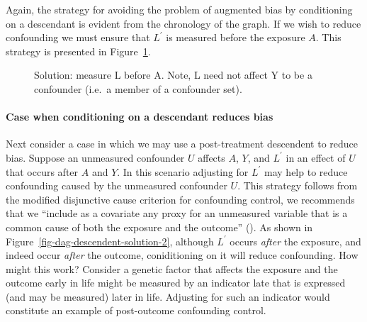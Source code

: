 \documentclass[
  singlecolumn,
  9pt]{article}
\let\oldparagraph\paragraph
\renewcommand{\paragraph}[1]{\oldparagraph{#1}\mbox{}}
\begin{document}
Again, the strategy for avoiding the problem of augmented bias by
conditioning on a descendant is evident from the chronology of the
graph. If we wish to reduce confounding we must ensure that \(L^\prime\)
is measured before the exposure \(A\). This strategy is presented in
Figure~\ref{fig-dag-descendent-solution}.

\begin{figure}


\caption{\label{fig-dag-descendent-solution}Solution: measure L before
A. Note, L need not affect Y to be a confounder (i.e.~a member of a
confounder set).}

\end{figure}%

\paragraph{Case when conditioning on a descendant reduces
bias}\label{case-when-conditioning-on-a-descendant-reduces-bias}

Next consider a case in which we may use a post-treatment descendent to
reduce bias. Suppose an unmeasured confounder \(U\) affects \(A\),
\(Y\), and \(L^\prime\) in an effect of \(U\) that occurs after \(A\)
and \(Y\). In this scenario adjusting for \(L^\prime\) may help to
reduce confounding caused by the unmeasured confounder \(U\). This
strategy follows from the modified disjunctive cause criterion for
confounding control, we recommends that we ``include as a covariate any
proxy for an unmeasured variable that is a common cause of both the
exposure and the outcome'' (). As shown in Figure~\ref{fig-dag-descendent-solution-2}, although
\(L^\prime\) occurs \emph{after} the exposure, and indeed occur
\emph{after} the outcome, coniditioning on it will reduce confounding.
How might this work? Consider a genetic factor that affects the exposure
and the outcome early in life might be measured by an indicator late
that is expressed (and may be measured) later in life. Adjusting for
such an indicator would constitute an example of post-outcome
confounding control.
\end{document}
